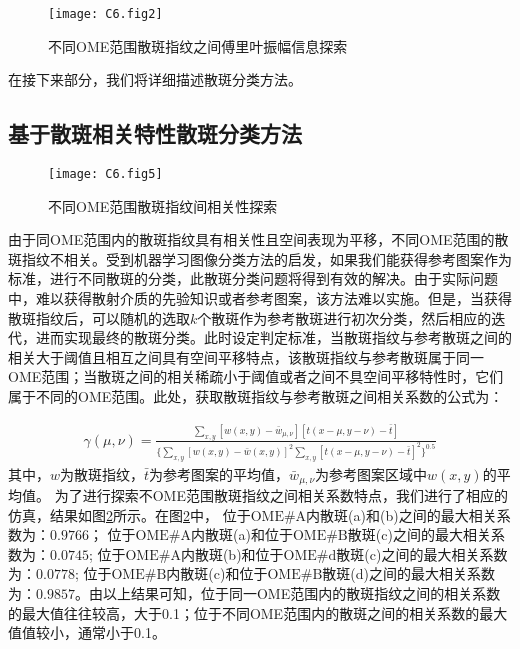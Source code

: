 \begin{figure}[htp]
	\centering
	\texttt{[image: C6.fig2]}
	\caption{不同OME范围散斑指纹之间傅里叶振幅信息探索}
	\label{fig:6.2}
\end{figure}
在接下来部分，我们将详细描述散斑分类方法。

\subsection{基于散斑相关特性散斑分类方法}

\begin{figure}[htp]
	\centering
	\texttt{[image: C6.fig5]}
	\caption{不同OME范围散斑指纹间相关性探索}
	\label{fig:6.5}
\end{figure}

由于同OME范围内的散斑指纹具有相关性且空间表现为平移，不同OME范围的散斑指纹不相关。受到机器学习图像分类方法的启发，如果我们能获得参考图案作为标准，进行不同散斑的分类，此散斑分类问题将得到有效的解决。由于实际问题中，难以获得散射介质的先验知识或者参考图案，该方法难以实施。但是，当获得散斑指纹后，可以随机的选取$k$个散斑作为参考散斑进行初次分类，然后相应的迭代，进而实现最终的散斑分类。此时设定判定标准，当散斑指纹与参考散斑之间的相关大于阈值且相互之间具有空间平移特点，该散斑指纹与参考散斑属于同一OME范围；当散斑之间的相关稀疏小于阈值或者之间不具空间平移特性时，它们属于不同的OME范围。此处，获取散斑指纹与参考散斑之间相关系数的公式为：

\begin{equation}
\begin{aligned}
\gamma (\mu,\nu) = \frac{\sum_{x,y} [w(x,y)- \bar{w}_{\mu,\nu}] [t(x-\mu,y-\nu)- \bar{t}]}{\{ \sum_{x,y} [w(x,y)- \bar{w}(x,y)]^2 \sum_{x,y} [t(x-\mu,y-\nu)- \bar{t}]^2  \}^{0.5}}
\label{eq:6.5}
\end{aligned}
\end{equation}
其中，$w$为散斑指纹，$\bar{t}$为参考图案的平均值，$\bar{w}_{\mu,\nu}$为参考图案区域中$w(x,y)$的平均值。
为了进行探索不OME范围散斑指纹之间相关系数特点，我们进行了相应的仿真，结果如图\ref{fig:6.5}所示。在图\ref{fig:6.5}中，
位于$\mbox{OME} \# \mbox{A}$内散斑(a)和(b)之间的最大相关系数为：$0.9766$；
位于$\mbox{OME} \# \mbox{A}$内散斑(a)和位于$\mbox{OME} \# \mbox{B}$散斑(c)之间的最大相关系数为：$0.0745$;
位于$\mbox{OME} \# \mbox{A}$内散斑(b)和位于$\mbox{OME} \# \mbox{d}$散斑(c)之间的最大相关系数为：$0.0778$;
位于$\mbox{OME} \# \mbox{B}$内散斑(c)和位于$\mbox{OME} \# \mbox{B}$散斑(d)之间的最大相关系数为：$0.9857$。由以上结果可知，位于同一OME范围内的散斑指纹之间的相关系数的最大值往往较高，大于0.1；位于不同OME范围内的散斑之间的相关系数的最大值值较小，通常小于0.1。

